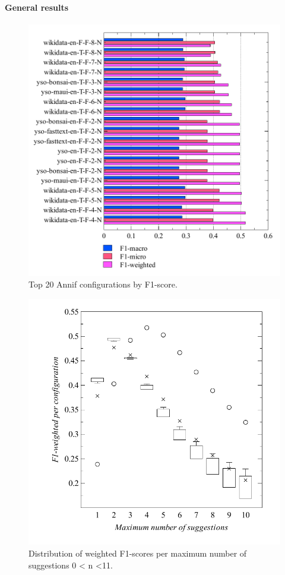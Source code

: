 \hypertarget{general-results}{%
\paragraph{General results}\label{general-results}}

\begin{figure}
\centering
\includegraphics{images/metrics_f1_top20.pdf}
\caption{Top 20 Annif configurations by F1-score.}
\end{figure}

\begin{figure}
\centering
\includegraphics{images/metrics_all_n.pdf}
\caption{Distribution of weighted F1-scores per maximum number of
suggestions 0 \textless{} n \textless11.}
\end{figure}

